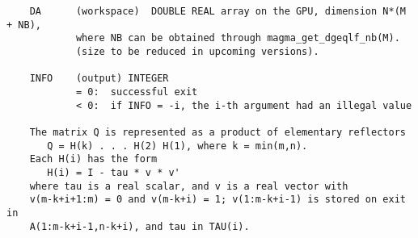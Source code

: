 \documentclass[10pt]{book}
\begin{document}
\begin{verbatim}
    DA      (workspace)  DOUBLE REAL array on the GPU, dimension N*(M + NB),
            where NB can be obtained through magma_get_dgeqlf_nb(M).
            (size to be reduced in upcoming versions).

    INFO    (output) INTEGER
            = 0:  successful exit
            < 0:  if INFO = -i, the i-th argument had an illegal value

    The matrix Q is represented as a product of elementary reflectors
       Q = H(k) . . . H(2) H(1), where k = min(m,n).
    Each H(i) has the form
       H(i) = I - tau * v * v'
    where tau is a real scalar, and v is a real vector with
    v(m-k+i+1:m) = 0 and v(m-k+i) = 1; v(1:m-k+i-1) is stored on exit in
    A(1:m-k+i-1,n-k+i), and tau in TAU(i).
\end{verbatim}

\newpage
\end{document}
